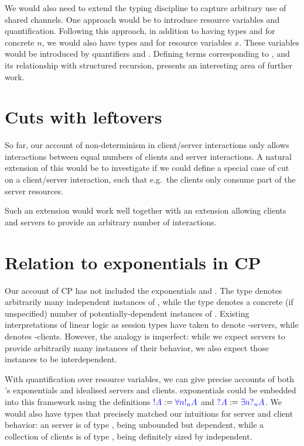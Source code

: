 We would also need to extend the typing discipline to capture arbitrary use of
shared channels.  One approach would be to introduce resource variables and
quantification.  Following this approach, in addition to having types  and  for concrete $n$, we would also have types  and
 for resource variables $x$.  These variables would be introduced by
quantifiers  and .  Defining terms
corresponding to , and its relationship with structured recursion,
presents an interesting area of further work.

\section{Cuts with leftovers}
So far, our account of non-determinism in client/server interactions only allows
interactions between equal numbers of clients and server interactions.
A natural extension of this would be to investigate if we could define a special
case of cut on a client/server interaction, such that e.g.\ the clients only
consume part of the server resources.
\begin{scprooftree}
\end{scprooftree}
Such an extension would work well together with an extension allowing clients
and servers to provide an arbitrary number of interactions.

\section{Relation to exponentials in CP}
Our account of CP has not included the exponentials  and .
The type  denotes arbitrarily many independent instances of , while
the type  denotes a concrete (if unspecified) number of
potentially-dependent instances of .  Existing interpretations of linear
logic as session types have taken  to denote -servers, while
 denotes -clients.  However, the analogy is imperfect: while we
expect servers to provide arbitrarily many instances of their behavior, we also
expect those instances to be interdependent.

With quantification over resource variables, we can give precise accounts
of both \cp's exponentials and idealised servers and clients.
\cp exponentials could be embedded into this framework using the definitions
$\ty{\take{A}} := \ty{\forall{n}\take[n]{A}}$ and $\ty{\give{A}} :=
\ty{\exists{n}{\give[n]{A}}}$.
We would also have types that precisely matched our intuitions for server and
client behavior: an  server is of type , being
unbounded but dependent, while a collection of  clients is of type
, being definitely sized by independent.

